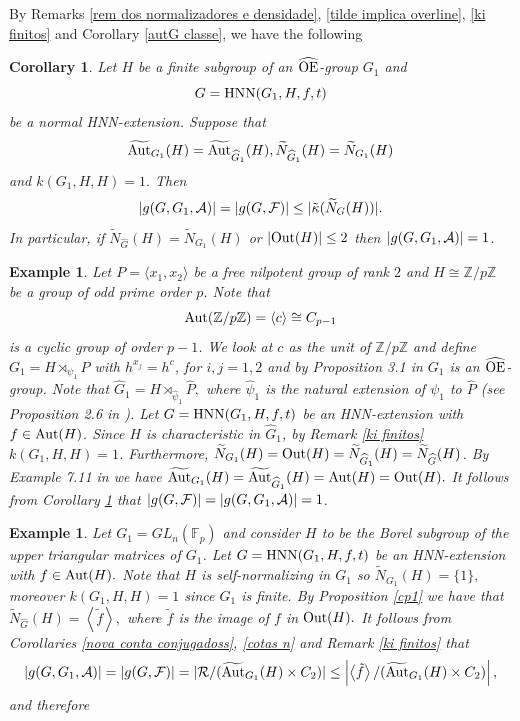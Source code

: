 \documentclass[a4paper,12pt]{article}
\newtheorem{cor}[thm]{Corollary}
\newcommand{\Z}{\mathbb{Z}}
\newcommand{\A}{{\cal A}}
\newcommand{\Oe}{\rm \widehat{OE}}
\def\aut {{\rm Aut}}
\def\out {{\rm Out}}
\def\hnn {{\rm HNN}}
\def\Z{{\mathbb Z}}
\newtheorem{exa}[thm]{Example}
\begin{document}
{By Remarks \ref{rem dos normalizadores e densidade}, \ref{tilde implica overline}, \ref{ki finitos} and Corollary \ref{autG classe}, we have the following

\begin{cor}\label{densohnn} Let $H$ be a finite subgroup of an $\Oe$-group $G_1$ and $$G=\hnn(G_1, H, f, t)$$ be a normal HNN-extension. Suppose that  $$\widetilde{\aut}_{G_1}(H) = \widetilde{\aut}_{\widehat G_1}(H), \widetilde{N}_{\widehat G_1}(H)=\widetilde{N}_{ G_1}(H)$$ and $k(G_1, H, H)=1.$ Then $$|g(G, G_1,\A)|=|g(G, \mathcal{F})|\leq |\tilde \kappa(\widetilde{N}_{ G}(H))|.$$ In particular, if $\widetilde{N}_{\widehat G}(H)=\widetilde{N}_{G_1}(H)$ or $|\out(H)|\leq 2$ then $|g(G, G_1,\A)|=1$. 
\end{cor}


\begin{exa} Let $P=\langle x_1, x_2\rangle$ be a  free nilpotent group of rank $2$ and \break $H\cong \Z/p \Z$ be  a group of odd prime order $p$. Note that $$\aut(\Z/p \Z)=\langle c\rangle\cong C_{p-1}$$ is a  cyclic group of order  $p-1$.   We look at $c$ as the unit of $\Z/p\Z$ and define $G_1=H\rtimes_{\psi_1} P$ with $h^{x_j}= h^{c}$, for $i,j=1,2$ and by Proposition 3.1 in \cite{BPZ2} $G_1$ is an $\Oe$-group. Note that $\widehat G_1=H\rtimes_{\hat \psi_1} \widehat P,$ where $\hat \psi_1$ is the natural extension of $\psi_1$ to $\widehat P$ (see Proposition 2.6 in \cite{GZ}). Let $G=\hnn(G_1,H,f,t)$ be an HNN-extension with $f\in \aut(H)$. Since $H$ is characteristic in $\widehat G_1$, by Remark \ref{ki finitos} $k(G_1, H, H)=1$. Furthermore, $\widetilde{N}_{G_1}(H)=\out(H)=\widetilde{N}_{\widehat G_1}(H)=\widetilde{N}_{\widehat{G}}(H)$. By Example 7.11 in \cite{BPZ2} we have $\widetilde{\aut}_{ G_1}(H)=\widetilde{\aut}_{\widehat{G}_1}(H)=\aut(H)=\out(H).$ It follows from Corollary \ref{densohnn} that $|g(G,\mathcal{F})|=|g(G,G_1,\A)|=1$. 
\end{exa}

\begin{exa} Let $G_1 = GL_n(\mathbb{F}_p)$ and consider $H$ to be the Borel subgroup of the upper triangular matrices of $G_1$. Let $G=\hnn(G_1, H, f, t)$ be an HNN-extension with $f \in \aut(H).$ Note that $H$ is self-normalizing in $G_1$ so $\widetilde{N}_{G_1}(H)=\{1\},$ moreover $k(G_1, H, H)=1$ since $G_1$ is finite. By Proposition \ref{cp1} we have that $\widetilde{N}_{\widehat{G}}(H)=\left \langle \tilde{f} \right \rangle,$ where $\tilde{ f}$ is the image of $f$ in $\out(H).$ It follows from Corollaries \ref{nova conta conjugadoss}, \ref{cotas n} and  Remark \ref{ki finitos} %
that  $$|g(G,G_1,\A)|=|g(G,\mathcal{F})|= |\mathcal{R}/(\widetilde{\aut}_{ G_1}(H) \times C_2)| \leq \left| \left \langle \tilde{f} \right \rangle / (\widetilde{\aut}_{ G_1}(H) \times C_2) \right|,$$ and therefore %


\end{exa}}
\end{document}
